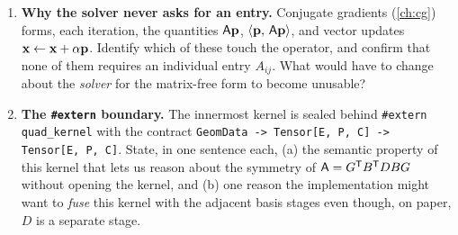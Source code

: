 \begin{enumerate}[nosep]
  \item \textbf{Why the solver never asks for an entry.} Conjugate gradients
  (\cref{ch:cg}) forms, each iteration, the quantities $\mathsf{A}\mathbf{p}$,
  $\left\langle \mathbf{p},\, \mathsf{A}\mathbf{p}\right\rangle$, and vector updates $\mathbf{x}\leftarrow\mathbf{x}+\alpha\mathbf{p}$.
  Identify which of these touch the operator, and confirm that none of them
  requires an individual entry $A_{ij}$. What would have to change about the
  \emph{solver} for the matrix-free form to become unusable?

  \item \textbf{The \texttt{\#extern} boundary.} The innermost kernel is sealed
  behind \lstinline[style=l4style]|#extern quad_kernel| with the contract
  \lstinline[style=l4style]|GeomData -> Tensor[E, P, C] -> Tensor[E, P, C]|.
  State, in one sentence each, (a) the semantic property of this kernel that lets
  us reason about the symmetry of $\mathsf{A}=G^{\mathsf T}B^{\mathsf T}DBG$ without
  opening the kernel, and (b) one reason the implementation might want to
  \emph{fuse} this kernel with the adjacent basis stages even though, on paper,
  $D$ is a separate stage.
\end{enumerate}
